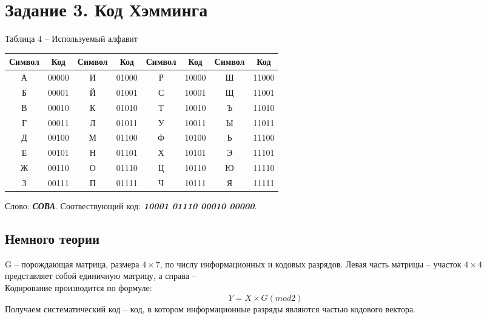 \documentclass[a5paper, 10pt]{article}
\theoremstyle{definition}
\theoremstyle{plain}
\theoremstyle{remark}
\begin{document}
\section{Задание 3. Код Хэмминга}
\begin{center}
Таблица 4 -- Используемый алфавит\\
\begin{tabular}{ |c|c|c|c|c|c|c|c| } 
 \hline
Символ & Код & Символ & Код & Символ & Код & Символ & Код\\
\hline
А & 00000 & И  & 01000 & Р  & 10000  & Ш  & 11000 \\
 \hline
Б & 00001 & Й  & 01001 & С  & 10001  & Щ  & 11001 \\
 \hline
В & 00010 & К  & 01010 & Т  & 10010  & Ъ  & 11010 \\
 \hline
Г & 00011 & Л  & 01011 & У  & 10011  & Ы  & 11011 \\
 \hline
Д & 00100 & М  & 01100 & Ф  & 10100  & Ь  & 11100 \\
 \hline
Е & 00101 & Н & 01101 & Х  & 10101  & Э  & 11101 \\
 \hline
Ж & 00110 & О  & 01110 & Ц  & 10110  & Ю  & 11110 \\
 \hline
З & 00111 & П & 01111 & Ч  & 10111  & Я  & 11111 \\
 \hline
\end{tabular}
\end{center}

Слово: \textbf{\textit{СОВА}}.
Соотвествующий код: \textbf{\textit{10001 01110 00010 00000}}.

\subsection{Немного теории}
G -- порождающая матрица, размера $4 \times 7$, по числу информационных и кодовых разрядов. Левая часть матрицы -- участок  $4 \times 4$ представляет собой единичную матрицу, а справа -- \\


Кодирование производится по формуле:
\begin{equation}
Y = X \times G  (mod 2)
\end{equation}
Получаем систематический код -- код, в котором информационные разряды являются частью кодового вектора.\\
\end{document}
